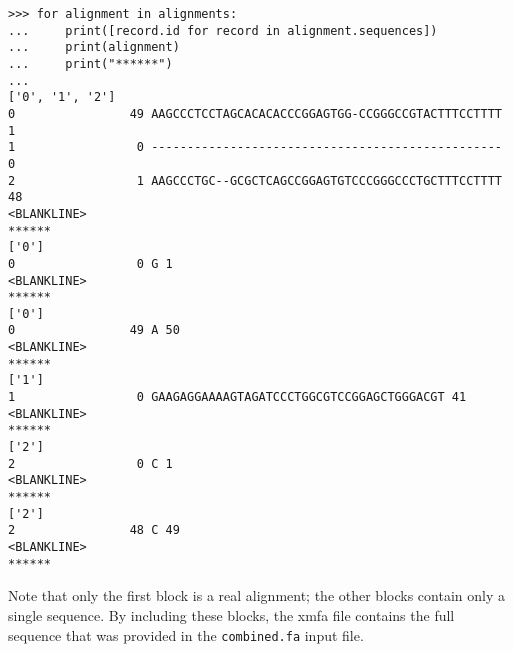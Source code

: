 \begin{verbatim}
>>> for alignment in alignments:
...     print([record.id for record in alignment.sequences])
...     print(alignment)
...     print("******")
...
['0', '1', '2']
0                49 AAGCCCTCCTAGCACACACCCGGAGTGG-CCGGGCCGTACTTTCCTTTT  1
1                 0 -------------------------------------------------  0
2                 1 AAGCCCTGC--GCGCTCAGCCGGAGTGTCCCGGGCCCTGCTTTCCTTTT 48
<BLANKLINE>
******
['0']
0                 0 G 1
<BLANKLINE>
******
['0']
0                49 A 50
<BLANKLINE>
******
['1']
1                 0 GAAGAGGAAAAGTAGATCCCTGGCGTCCGGAGCTGGGACGT 41
<BLANKLINE>
******
['2']
2                 0 C 1
<BLANKLINE>
******
['2']
2                48 C 49
<BLANKLINE>
******
\end{verbatim}
Note that only the first block is a real alignment; the other blocks contain only a single sequence. By including these blocks, the xmfa file contains the full sequence that was provided in the \verb|combined.fa| input file.


